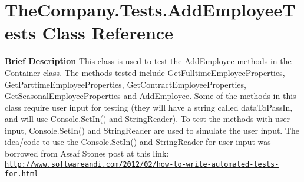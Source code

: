 \hypertarget{class_the_company_1_1_tests_1_1_add_employee_tests}{}\section{The\+Company.\+Tests.\+Add\+Employee\+Tests Class Reference}
\label{class_the_company_1_1_tests_1_1_add_employee_tests}


{\bfseries  Brief Description} This class is used to test the Add\+Employee methods in the Container class. The methods tested include Get\+Fulltime\+Employee\+Properties, Get\+Parttime\+Employee\+Properties, Get\+Contract\+Employee\+Properties, Get\+Seasonal\+Employee\+Properties and Add\+Employee. Some of the methods in this class require user input for testing (they will have a string called data\+To\+Pass\+In, and will use Console.\+Set\+In() and String\+Reader). To test the methods with user input, Console.\+Set\+In() and String\+Reader are used to simulate the user input. The idea/code to use the Console.\+Set\+In() and String\+Reader for user input was borrowed from Assaf Stone\textquotesingle{}s post at this link\+: \href{http://www.softwareandi.com/2012/02/how-to-write-automated-tests-for.html}{\tt http\+://www.\+softwareandi.\+com/2012/02/how-\/to-\/write-\/automated-\/tests-\/for.\+html}  


